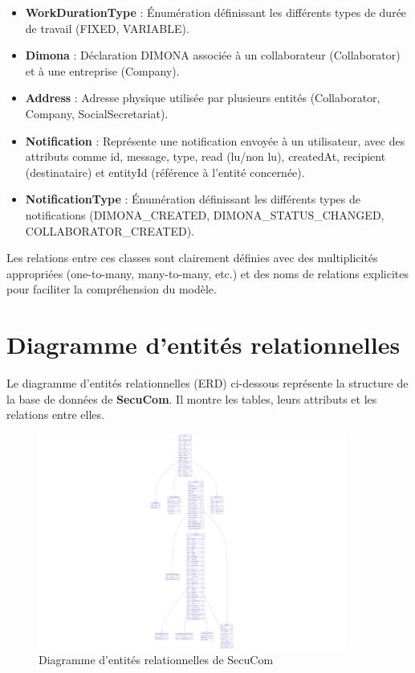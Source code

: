 \begin{itemize}[leftmargin=*,label=\textcolor{darkgray}{$\bullet$},itemsep=0.3em]
  \item \textbf{WorkDurationType} : Énumération définissant les différents types de durée de travail (FIXED, VARIABLE).

  \item \textbf{Dimona} : Déclaration DIMONA associée à un collaborateur (Collaborator) et à une entreprise (Company).

  \item \textbf{Address} : Adresse physique utilisée par plusieurs entités (Collaborator, Company, SocialSecretariat).
  
  \item \textbf{Notification} : Représente une notification envoyée à un utilisateur, avec des attributs comme id, message, type, read (lu/non lu), createdAt, recipient (destinataire) et entityId (référence à l'entité concernée).
  
  \item \textbf{NotificationType} : Énumération définissant les différents types de notifications (DIMONA\_CREATED, DIMONA\_STATUS\_CHANGED, COLLABORATOR\_CREATED).
\end{itemize}

Les relations entre ces classes sont clairement définies avec des multiplicités appropriées (one-to-many, many-to-many, etc.) et des noms de relations explicites pour faciliter la compréhension du modèle.

\newpage

\section{Diagramme d'entités relationnelles}

\noindent Le diagramme d'entités relationnelles (ERD) ci-dessous représente la structure de la base de données de \textbf{SecuCom}. Il montre les tables, leurs attributs et les relations entre elles.

\begin{figure}[H]
\centering
\includegraphics[width=0.9\textwidth]{ERD.png}
\caption{Diagramme d'entités relationnelles de SecuCom}
\end{figure}

